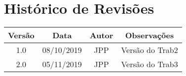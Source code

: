 \chapter*{\centering Histórico de Revisões}

\begin{center}
    \begin{tabular}{|c|c|c|c|}
        \hline
        Versão & Data       & Autor & Observações                                      \\
        \hline
        1.0    & 08/10/2019 & JPP   & Versão do Trab2                                  \\
        \hline
        2.0    & 05/11/2019 & JPP   & Versão do Trab3                                  \\
        \hline
    \end{tabular}
\end{center}
